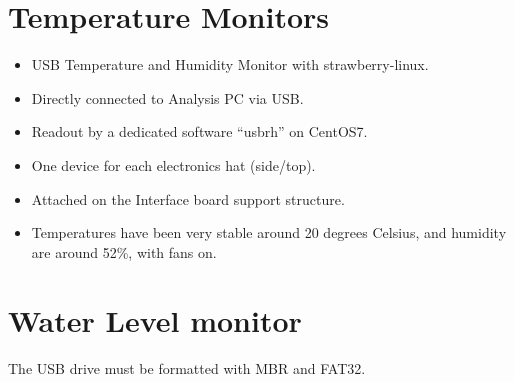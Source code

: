 \section{Temperature Monitors}
\begin{itemize}
\item USB Temperature and Humidity Monitor with strawberry-linux.
\item Directly connected to Analysis PC via USB.
\item Readout by a dedicated software ``usbrh'' on CentOS7.
\item One device for each electronics hat (side/top).
\item Attached on the Interface board support structure.
\item Temperatures have been very stable around 20 degrees Celsius, and humidity
  are around 52\%, with fans on.
\end{itemize}
\section{Water Level monitor}
The USB drive must be formatted with MBR and FAT32.

